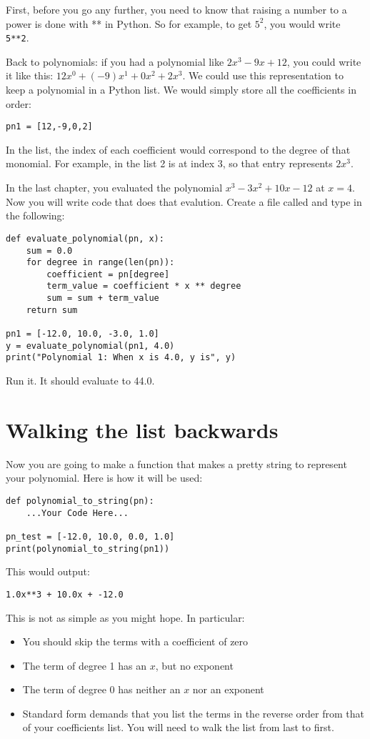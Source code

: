 First, before you go any further, you need to know that raising a
number to a power is done with ** in Python.  So for example, to get
$5^2$, you would write \texttt{5**2}.

Back to polynomials: if you had a polynomial like $2x^3 -9x + 12$, you
could write it like this: $12x^0 + (-9)x^1 + 0x^2 + 2x^3$.  We could
use this representation to keep a polynomial in a Python list. We
would simply store all the coefficients in order:
\begin{Verbatim}
pn1 = [12,-9,0,2]
\end{Verbatim}

In the list, the index of each coefficient would correspond to the
degree of that monomial. For example, in the list 2 is at index 3, so
that entry represents $2x^3$.

In the last chapter, you evaluated the polynomial $x^3 - 3x^2 + 10x -
12$ at $x=4$. Now you will write code that does that evalution.
Create a file called  and type in the following:

\begin{Verbatim}
def evaluate_polynomial(pn, x):
    sum = 0.0  
    for degree in range(len(pn)):
        coefficient = pn[degree]
        term_value = coefficient * x ** degree
        sum = sum + term_value
    return sum
   
pn1 = [-12.0, 10.0, -3.0, 1.0]
y = evaluate_polynomial(pn1, 4.0)
print("Polynomial 1: When x is 4.0, y is", y)
\end{Verbatim}

Run it. It should evaluate to 44.0.

\section{Walking the list backwards}

Now you are going to make a function that makes a pretty string to
represent your polynomial. Here is how it will be used:
\begin{Verbatim}
def polynomial_to_string(pn):
    ...Your Code Here...

pn_test = [-12.0, 10.0, 0.0, 1.0]
print(polynomial_to_string(pn1))
\end{Verbatim}

This would output:
\begin{Verbatim}
1.0x**3 + 10.0x + -12.0
\end{Verbatim}
This is not as simple as you might hope. In particular:
\begin{itemize}
\item You should skip the terms with a coefficient of zero
\item The term of degree 1 has an $x$, but no exponent
\item The term of degree 0 has neither an $x$ nor an exponent
\item Standard form demands that you list the terms in the reverse
  order from that of your coefficients list. You will need to walk the
  list from last to first.
\end{itemize}


